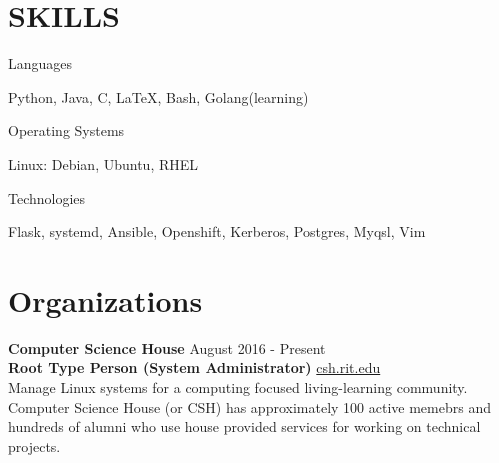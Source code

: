 \documentclass[line, margin]{res}
\begin{document}
\begin{resume}
\section{SKILLS}
\begin{compactdesc}
    \item[Languages] \begin{inparaenum} {Python, Java, C, \LaTeX, Bash, Golang(learning)} \end{inparaenum}
    \item[Operating Systems] \begin{inparaenum} {Linux: Debian, Ubuntu, RHEL} \end{inparaenum}
    \item[Technologies] \begin{inparaenum} {Flask, systemd, Ansible, Openshift, Kerberos, Postgres, Myqsl, Vim} \end{inparaenum}
\end{compactdesc}

\section{Organizations}
{\bf \large{Computer Science House}} \hfill August 2016 - Present \\
{\bf Root Type Person (System Administrator)} \hfill \url{csh.rit.edu} \\
Manage Linux systems for a computing focused living-learning community.
Computer Science House (or CSH) has approximately 100 active memebrs and hundreds of alumni
who use house provided services for working on technical projects.



\end{resume}
\end{document}
